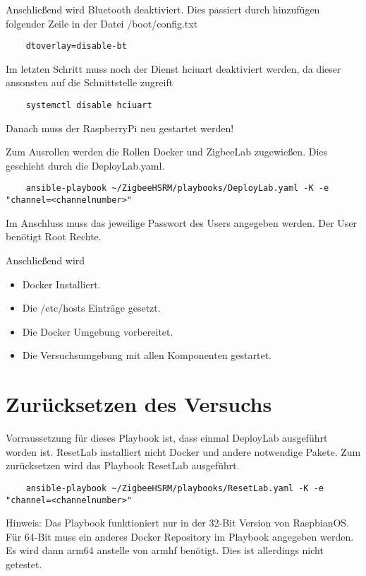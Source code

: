 Anschließend wird Bluetooth deaktiviert. Dies passiert durch hinzufügen folgender Zeile in der Datei \grqq /boot/config.txt\grqq{}
\begin{lstlisting}
    dtoverlay=disable-bt
\end{lstlisting}

Im letzten Schritt muss noch der Dienst \grqq hciuart\grqq{} deaktiviert werden, da dieser ansonsten auf die Schnittstelle zugreift
\begin{lstlisting}
    systemctl disable hciuart
\end{lstlisting}

Danach muss der RaspberryPi neu gestartet werden! 


Zum Ausrollen werden die Rollen \grqq Docker\grqq{} und \grqq ZigbeeLab\grqq{} zugewießen. Dies geschieht durch die DeployLab.yaml.
\begin{lstlisting}
    ansible-playbook ~/ZigbeeHSRM/playbooks/DeployLab.yaml -K -e "channel=<channelnumber>"
\end{lstlisting}
Im Anschluss muss das jeweilige Passwort des Users angegeben werden. Der User benötigt Root Rechte.

Anschließend wird
\begin{itemize}
    \item Docker Installiert.
    \item Die /etc/hosts Einträge gesetzt.
    \item Die Docker Umgebung vorbereitet.
    \item Die Versuchsumgebung mit allen Komponenten gestartet.
\end{itemize}

\section{Zurücksetzen des Versuchs}

Vorraussetzung für dieses Playbook ist, dass einmal DeployLab ausgeführt worden ist. ResetLab installiert nicht Docker und andere notwendige Pakete.
Zum zurücksetzen wird das Playbook \grqq ResetLab\grqq{} ausgeführt.

\begin{lstlisting}
    ansible-playbook ~/ZigbeeHSRM/playbooks/ResetLab.yaml -K -e "channel=<channelnumber>"
\end{lstlisting}
Hinweis: Das Playbook funktioniert nur in der 32-Bit Version von RaspbianOS. Für 64-Bit muss ein anderes Docker Repository im Playbook angegeben werden.
Es wird dann arm64 anstelle von armhf benötigt. Dies ist allerdings nicht getestet.

